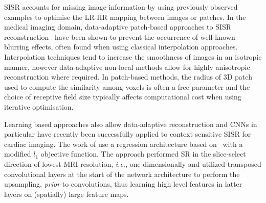 \documentclass[runningheads,a4paper]{llncs}
\begin{document}

SISR accounts for missing image information by using previously observed examples to optimise the LR-HR mapping between images or patches. In the medical imaging domain, data-adaptive patch-based approaches to SISR reconstruction~\cite{Jia2016single,Manjon2010non} have been shown to prevent the occurrence of well-known blurring effects, often found when using classical interpolation approaches. Interpolation techniques tend to increase the smoothness of images in an isotropic manner, however data-adaptive non-local methods allow for highly anisotropic reconstruction where required. In patch-based methods, the radius of 3D patch used to compute the similarity among voxels is often a free parameter and the choice of receptive field size typically affects computational cost when using iterative optimisation. 

Learning based approaches also allow data-adaptive reconstruction and CNNs in particular have recently been successfully applied to context sensitive SISR for cardiac imaging. The work of \cite{Oktay2016} use a regression architecture based on~\cite{Dong2016a} with a modified $l_1$ objective function. The approach performed SR in the slice-select direction of lowest MRI resolution, \emph{i.e.}, one-dimensionally and utilized transposed convolutional layers at the start of the network architecture to perform the upsampling, \emph{prior} to convolutions, thus learning high level features in latter layers on (spatially) large feature maps. 
\end{document}
